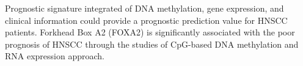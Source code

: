 \documentclass[jpm,article,submit,moreauthors,pdftex]{Definitions/mdpi}
\begin{document}
\begin{paracol}{2}
Prognostic signature integrated of DNA methylation, gene expression, and clinical information could provide a prognostic prediction value for HNSCC patients. Forkhead Box A2 (FOXA2) is significantly associated with the poor prognosis of HNSCC through the studies of CpG-based DNA methylation and RNA expression approach\cite{Shen2017a}.







\end{paracol}
\end{document}
